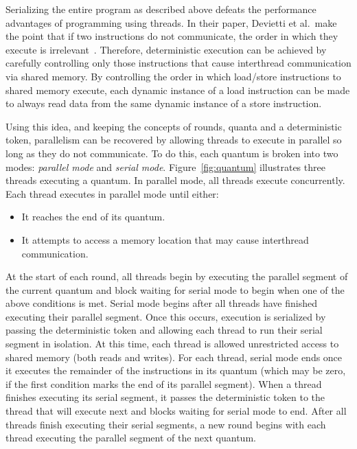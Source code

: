 Serializing the entire program as described above defeats the
performance advantages of programming using threads.  In their paper,
Devietti et al.\ make the point that if two instructions do not
communicate, the order in which they execute is irrelevant~\cite{dmp}.
Therefore, deterministic execution can be achieved by carefully
controlling only those instructions that cause interthread
communication via shared memory.  By controlling the order in which
load/store instructions to shared memory execute, each dynamic
instance of a load instruction can be made to always read data from
the same dynamic instance of a store instruction.

Using this idea, and keeping the concepts of rounds, quanta and a
deterministic token, parallelism can be recovered by allowing threads
to execute in parallel so long as they do not communicate.  To do
this, each quantum is broken into two modes: \emph{parallel mode} and
\emph{serial mode}.  Figure~\ref{fig:quantum} illustrates three
threads executing a quantum.  In parallel mode, all threads execute
concurrently.  Each thread executes in parallel mode until either:

\begin{itemize}
\item It reaches the end of its quantum.

\item It attempts to access a memory location that may cause
  interthread communication.
\end{itemize}

At the start of each round, all threads begin by executing the
parallel segment of the current quantum and block waiting for serial
mode to begin when one of the above conditions is met.  Serial mode
begins after all threads have finished executing their parallel
segment.  Once this occurs, execution is serialized by passing the
deterministic token and allowing each thread to run their serial
segment in isolation.  At this time, each thread is allowed
unrestricted access to shared memory (both reads and writes).  For
each thread, serial mode ends once it executes the remainder of the
instructions in its quantum (which may be zero, if the first condition
marks the end of its parallel segment).  When a thread finishes
executing its serial segment, it passes the deterministic token to the
thread that will execute next and blocks waiting for serial mode to
end.  After all threads finish executing their serial segments, a new
round begins with each thread executing the parallel segment of the
next quantum.

